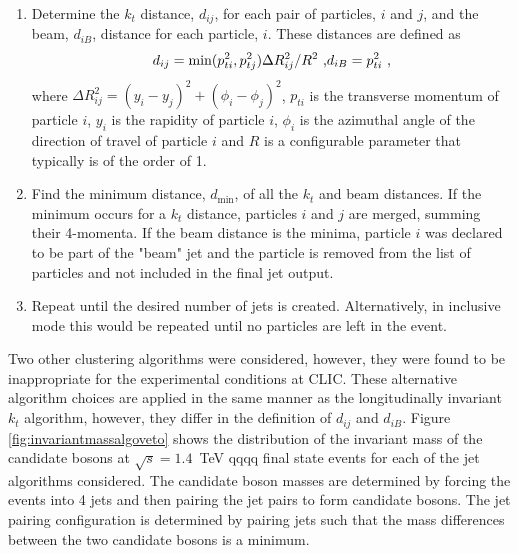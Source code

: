 \begin{enumerate}
\item Determine the $k_{t}$ distance, $d_{ij}$, for each pair of particles, $i$ and $j$, and the beam, $d_{iB}$, distance for each particle, $i$.  These distances are defined as
\begin{equation}
d_{ij} = \text{min}(p_{ti}^{2}, p_{tj}^{2}){\Delta}R^{2}_{ij}/R^{2} \text{ ,} \\
d_{iB} = p_{ti}^{2} \text{ ,}
\end{equation}
where ${\Delta}R^{2}_{ij} = (y_{i} - y_{j})^2 + (\phi_{i} - \phi_{j})^2$, $p_{ti}$ is the transverse momentum of particle $i$, $y_{i}$ is the rapidity of particle $i$, $\phi_{i}$ is the azimuthal angle of the direction of travel of particle $i$ and $R$ is a configurable parameter that typically is of the order of 1.
\item Find the minimum distance, $d_\text{min}$, of all the $k_{t}$ and beam distances.  If the minimum occurs for a $k_{t}$ distance, particles $i$ and $j$ are merged, summing their 4-momenta.  If the beam distance is the minima, particle $i$ was declared to be part of the "beam" jet and the particle is removed from the list of particles and not included in the final jet output.
\item Repeat until the desired number of jets is created.  Alternatively, in inclusive mode this would be repeated until no particles are left in the event.
\end{enumerate}

\noindent Two other clustering algorithms were considered, however, they were found to be inappropriate for the experimental conditions at CLIC.  These alternative algorithm choices are applied in the same manner as the longitudinally invariant $k_{t}$ algorithm, however, they differ in the definition of $d_{ij}$ and $d_{iB}$.  Figure \ref{fig:invariantmassalgoveto} shows the distribution of the invariant mass of the candidate bosons at $\sqrt{s}=1.4$~TeV \nu{\nu}qqqq final state events for each of the jet algorithms considered.  The candidate boson masses are determined by forcing the events into 4 jets and then pairing the jet pairs to form candidate bosons.  The jet pairing configuration is determined by pairing jets such that the mass differences between the two candidate bosons is a minimum.  

